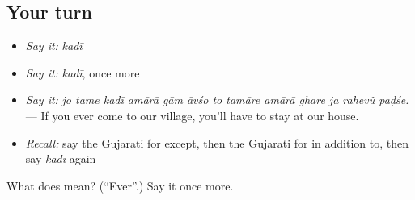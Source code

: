 \subsection*{Your turn}
\begin{itemize}
\raggedright
  \item \emph{Say it:} \emph{kadī}
  \item \emph{Say it:} \emph{kadī}, once more
  \item \emph{Say it:} \emph{jo tame kadī amārā gām āvśo to tamāre amārā ghare ja rahevũ paḍśe.} — If you ever come to our village, you'll have to stay at our house.
  \item \emph{Recall:} say the Gujarati for except, then the Gujarati for in addition to, then say \emph{kadī} again
\end{itemize}

\begin{tcolorbox}[breakable,colback=teal!4,colframe=teal!35!black,title={Before you move on}]
What does  mean? (\textquotedblleft{}Ever\textquotedblright{}.) Say it once more.
\end{tcolorbox}
